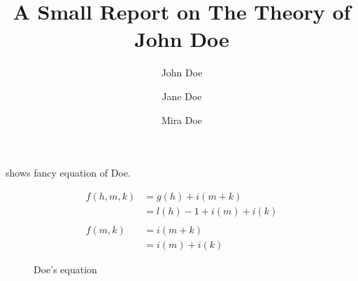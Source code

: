 \documentclass[a4paper, 11pt]{article}
\author{John Doe \and Jane Doe \and Mira Doe}
\title{A Small Report on The Theory of John Doe}
\begin{document}
\maketitle
\thispagestyle{fancy}

 shows fancy equation of Doe.
\begin{figure}[h]
\begin{align*}
	 f(h,m,k) & =  g(h) + i(m + k) \\
	 & =  l(h) - 1 + i(m) + i(k)\\\\
	 f(m,k) & =  i(m + k) \\
	 & =  i(m) + i(k)
\end{align*}
\caption{Doe's equation}
\label{fig:equation}
\end{figure}
\end{document}
